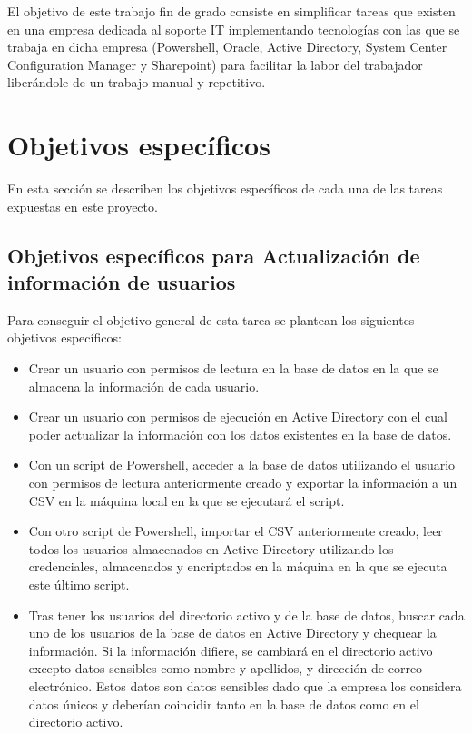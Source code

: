\documentclass[a4paper, 12pt]{book}
\begin{document}
El objetivo de este trabajo fin de grado consiste en simplificar tareas que existen en una empresa dedicada al soporte IT implementando tecnologías con las que se trabaja en dicha empresa (Powershell, Oracle, Active Directory, System Center Configuration Manager y Sharepoint) para facilitar la labor del trabajador liberándole de un trabajo manual y repetitivo.


\section{Objetivos específicos}
\label{sec:objetivos-especificos}

En esta sección se describen los objetivos específicos de cada una de las tareas expuestas en este proyecto.

\subsection{Objetivos específicos para Actualización de información de usuarios}
\label{Objetivos específicos para Actualización de información de usuarios}

Para conseguir el objetivo general de esta tarea se plantean los siguientes objetivos específicos:

\begin{itemize}
\item Crear un usuario con permisos de lectura en la base de datos en la que se almacena la información de cada usuario.

\item Crear un usuario con permisos de ejecución en Active Directory con el cual poder actualizar la información con los datos existentes en la base de datos.

\item Con un script de Powershell, acceder a la base de datos utilizando el usuario con permisos de lectura anteriormente creado y exportar la información a un CSV en la máquina local en la que se ejecutará el script.

\item Con otro script de Powershell, importar el CSV anteriormente creado, leer todos los usuarios almacenados en Active Directory utilizando los credenciales, almacenados y encriptados en la máquina en la que se ejecuta este último script.

\item Tras tener los usuarios del directorio activo y de la base de datos, buscar cada uno de los usuarios de la base de datos en Active Directory y chequear la información. Si la información difiere, se cambiará en el directorio activo excepto datos sensibles como nombre y apellidos, y dirección de correo electrónico. Estos datos son datos sensibles dado que la empresa los considera datos únicos y deberían coincidir tanto en la base de datos como en el directorio activo.
\end{itemize}
\end{document}
